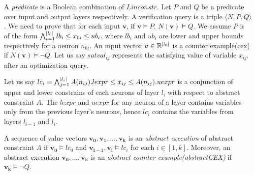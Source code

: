 A {\em predicate} is a Boolean combination of $Linconstr$.
Let $P$ and $Q$ be a predicate over input and output layers respectively.
A verification query is a triple $\langle N, P, Q \rangle$.
We need to prove that for each input $\boldsymbol{v}$,
if $\boldsymbol{v} \models P$, $N(\boldsymbol{v}) \models Q$.
We assume $P$ is of the form
$\bigwedge_{i=1}^{|l_0|}lb_i \leq x_{0i} \leq ub_i$, where $lb_i$ and $ub_i$ are lower and upper bounds respectively for a neuron $n_{0i}$.
An input vector $\boldsymbol{v} \in \mathbb{R}^{|l_0|}$ is a counter example(cex) if $N(\boldsymbol{v}) \models \lnot Q$. 
Let us say $satval_{ij}$ represents the satisfying value of variable $x_{ij}$, after an optimization query. 










Let us say $lc_i = \bigwedge_{j=1}^{|l_i|} A(n_{ij}).lexpr \leq x_{ij} \leq  A(n_{ij}).uexpr$ is a 
conjunction of upper and lower constrains of each neurons of layer $l_i$ with respect to abstract constraint $A$.
The $lexpr$ and $uexpr$ for any neuron of a layer contains variables only from the previous layer's neurons, 
hence $lc_i$ contains the variables from layers $l_{i-1}$ and $l_i$. 

\begin{df}
  A sequence of value vectors $\boldsymbol{v_0}, \boldsymbol{v_1}, ... , \boldsymbol{v_k}$ is an 
  {\em abstract execution} of abstract constraint $A$ if 
  $\boldsymbol{v_0} \models lc_0$ and $\boldsymbol{v_{i-1}}, \boldsymbol{v_i} \models lc_i$ for each $i \in [1,k]$.  
 Moreover, an abstract execution $\boldsymbol{v_0,...,v_k}$ is
 an {\em abstract counter example(abstractCEX)} if $\boldsymbol{v_k} \models \lnot Q$.
\end{df}



